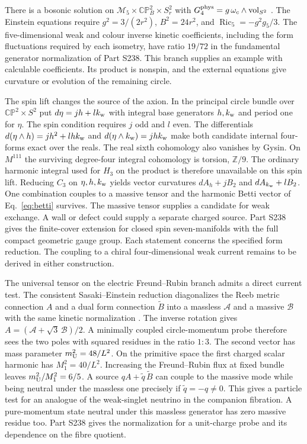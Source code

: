 \documentclass[aps,prd,reprint,onecolumn,nofootinbib,amsmath,amssymb]{revtex4-2}
\begin{document}
There is a bosonic solution on $\mathcal M_5\times\mathbb{CP}^2_B\times S^2_r$ with $G_4^{\rm phys}=g\,\omega_c\wedge{\rm vol}_{S^2}$ \cite{Dolan1985Kahler}. The Einstein equations require $g^2=3/(2r^2)$, $B^2=24r^2$, and $\operatorname{Ric}_5=-g^2g_5/3$. The five-dimensional weak and colour inverse kinetic coefficients, including the form fluctuations required by each isometry, have ratio $19/72$ in the fundamental generator normalization of Part S238. This branch supplies an example with calculable coefficients. Its product is nonspin, and the external equations give curvature or evolution of the remaining circle.

The spin lift changes the source of the axion. In the principal circle bundle over $\mathbb{CP}^2\times S^2$ put $d\eta=jh+lk_{\rm w}$ with integral base generators $h,k_{\rm w}$ and period one for $\eta$. The spin condition requires $j$ odd and $l$ even. The differentials $d(\eta\wedge h)=jh^2+lhk_{\rm w}$ and $d(\eta\wedge k_{\rm w})=jhk_{\rm w}$ make both candidate internal four-forms exact over the reals. The real sixth cohomology also vanishes by Gysin. On $M^{111}$ the surviving degree-four integral cohomology is torsion, $\mathbb Z/9$. The ordinary harmonic integral used for $H_3$ on the product is therefore unavailable on this spin lift. Reducing $C_3$ on $\eta,h,k_{\rm w}$ yields vector curvatures $dA_h+jB_2$ and $dA_{k_{\rm w}}+lB_2$. One combination couples to a massive tensor and the harmonic Betti vector of Eq.~\eqref{eq:betti} survives. The massive tensor supplies a candidate for weak exchange. A wall or defect could supply a separate charged source. Part S238 gives the finite-cover extension for closed spin seven-manifolds with the full compact geometric gauge group. Each statement concerns the specified form reduction. The coupling to a chiral four-dimensional weak current remains to be derived in either construction.

The universal tensor on the electric Freund--Rubin branch admits a direct current test. The consistent Sasaki--Einstein reduction diagonalizes the Reeb metric connection $A$ and a dual form connection $\widetilde B$ into a massless $\mathcal A$ and a massive $\mathcal B$ with the same kinetic normalization \cite{Gauntlett2009Massive}. The inverse rotation gives $A=(\mathcal A+\sqrt3\,\mathcal B)/2$. A minimally coupled circle-momentum probe therefore sees the two poles with squared residues in the ratio $1:3$. The second vector has mass parameter $m_{\rm U}^2=48/L^2$. On the primitive space the first charged scalar harmonic has $M_1^2=40/L^2$. Increasing the Freund--Rubin flux at fixed bundle leaves $m_{\rm U}^2/M_1^2=6/5$. A source $qA+\widetilde q\,\widetilde B$ can couple to the massive mode while being neutral under the massless one precisely if $\widetilde q=-q\ne0$. This gives a particle test for an analogue of the weak-singlet neutrino in the companion fibration. A pure-momentum state neutral under this massless generator has zero massive residue too. Part S238 gives the normalization for a unit-charge probe and its dependence on the fibre quotient.
\end{document}
